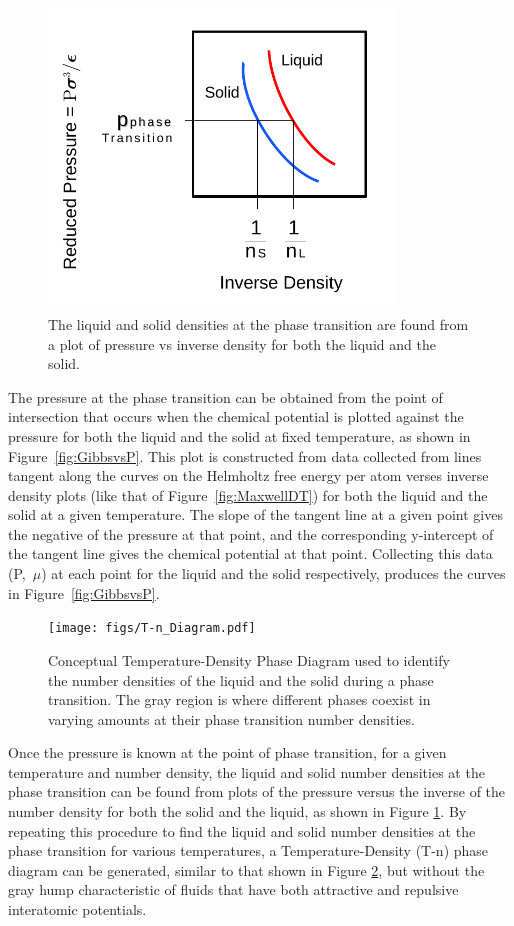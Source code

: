 \documentclass[double,12pt]{beavtex}
\begin{document}
\begin{figure}
    \centering
    \includegraphics[height=8cm]{figs/MaxwellDTC-Fig3.pdf}
    \caption{The liquid and solid densities at the phase transition are 
    found from a plot of pressure vs inverse density for both the liquid and the solid.}
    \label{fig:Pvsinvn}
  \end{figure}

The pressure at the phase transition can be obtained from the point of 
intersection that occurs when the chemical potential 
is plotted against the pressure for both the liquid and the 
solid at fixed temperature, as shown in Figure~\ref{fig:GibbsvsP}. 
This plot is constructed from data collected from lines tangent 
along the curves on the Helmholtz free energy per atom verses inverse 
density plots (like that of Figure~\ref{fig:MaxwellDT}) for both the 
liquid and the solid at a given temperature. 
The slope of the tangent line at a given point gives the negative of the 
pressure at that point, and the corresponding y-intercept of the tangent 
line gives the chemical potential at that point. Collecting this data 
(P,~$\mu$) at each point for the liquid and the solid respectively, 
produces the curves in Figure~\ref{fig:GibbsvsP}. 

\begin{figure}
    \centering
    \texttt{[image: figs/T-n\_Diagram.pdf]}
    \caption{Conceptual Temperature-Density Phase Diagram used to identify 
    the number densities of the liquid and the solid during a phase 
    transition. The gray region is where different phases coexist in 
    varying amounts at their phase transition number densities.}
    \label{fig:T-n_Diagram}
  \end{figure} 
  
Once the pressure is known at the point of phase transition, for a given 
temperature and number density, the liquid and solid number densities at 
the phase transition can be found from plots of the pressure versus the 
inverse of the number density for both the solid and the liquid, 
as shown in Figure \ref{fig:Pvsinvn}. By repeating this procedure to 
find the liquid and solid number densities at the phase transition 
for various temperatures, a Temperature-Density (T-n) phase diagram 
can be generated, similar to that shown in Figure \ref{fig:T-n_Diagram}, 
but without the gray hump characteristic of fluids that have 
both attractive and repulsive interatomic potentials. 
\end{document}
